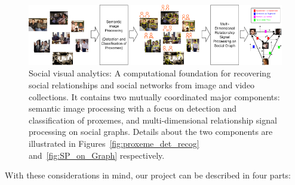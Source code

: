 \begin{figure}[t!]
\begin{center}
\includegraphics[width=\columnwidth]{overview}
\end{center}
\vspace{-0.25in} \caption{\captionsize 
Social visual analytics: A computational foundation for recovering social relationships and social networks from image and video collections. It contains two mutually coordinated major components: semantic image processing with a focus on detection and classification of proxemes, and multi-dimensional relationship signal processing on social graphs.  Details about the two components are illustrated in Figures~\ref{fig:proxeme_det_recog} and~\ref{fig:SP_on_Graph} respectively.\label{fig:intro}\afterfigspace}
\end{figure}


With these considerations in mind, our project can be described in four parts:


